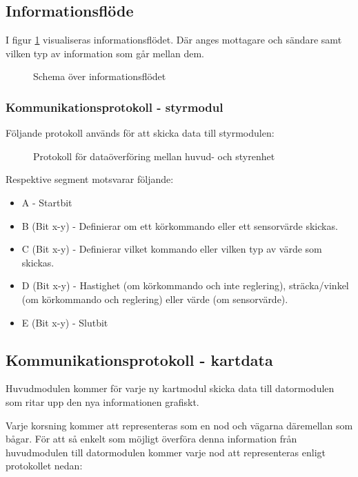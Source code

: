 \documentclass[11pt]{article}
\begin{document}
\begin{flushleft}
\subsection{Informationsflöde}
I figur \ref{informationFlow} visualiseras informationsflödet. Där anges mottagare och sändare samt vilken typ av information som går mellan dem.

\begin{figure}[htbp]
\centering
\noindent\resizebox{.8\linewidth}{!}{
	}
	\caption{Schema över informationsflödet\label{informationFlow}}	
\end{figure}

\subsubsection{Kommunikationsprotokoll - styrmodul}
Följande protokoll används för att skicka data till styrmodulen:

\begin{figure}[htbp]
\centering
\noindent\resizebox{.8\linewidth}{!}{
	}
	\caption{Protokoll för dataöverföring mellan huvud- och styrenhet\label{styrdata}}	
\end{figure}

Respektive segment motsvarar följande: 
\begin{itemize}
	\item A - Startbit
	\item B (Bit x-y) - Definierar om ett körkommando eller ett sensorvärde skickas.
	\item C (Bit x-y) - Definierar vilket kommando eller vilken typ av värde som skickas.
	\item D (Bit x-y) - Hastighet (om körkommando och inte reglering), sträcka/vinkel (om körkommando och reglering) eller värde (om sensorvärde).
	\item E (Bit x-y) - Slutbit
\end{itemize}

\subsection{Kommunikationsprotokoll - kartdata}
Huvudmodulen kommer för varje ny kartmodul skicka data till datormodulen som ritar upp den nya informationen grafiskt. 

Varje korsning kommer att representeras som en nod och vägarna däremellan som bågar. För att så enkelt som möjligt överföra denna information från huvudmodulen till datormodulen kommer varje nod att representeras enligt protokollet nedan:


\end{flushleft}
\end{document}
